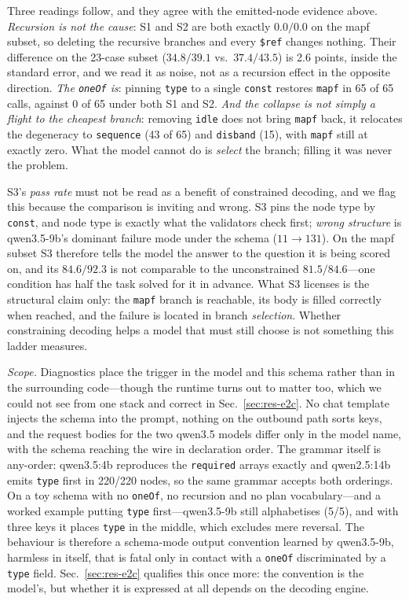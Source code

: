 \documentclass[10pt,twocolumn]{article}
\newcommand{\code}[1]{\texttt{\small #1}}
\begin{document}
Three readings follow, and they agree with the emitted-node evidence above.
\emph{Recursion is not the cause}: S1 and S2 are both exactly $0.0/0.0$ on the
mapf subset, so deleting the recursive branches and every \code{\$ref} changes
nothing. Their difference on the 23-case subset ($34.8/39.1$ vs.\ $37.4/43.5$)
is 2.6 points, inside the standard error, and we read it as noise, not as a recursion
effect in the opposite direction. \emph{The \code{oneOf} is}: pinning
\code{type} to a single \code{const} restores \code{mapf} in 65 of 65 calls,
against 0 of 65 under both S1 and S2. \emph{And the collapse is not simply a
flight to the cheapest branch}: removing \code{idle} does not bring \code{mapf}
back, it relocates the degeneracy to \code{sequence} (43 of 65) and
\code{disband} (15), with \code{mapf} still at exactly zero. What the model
cannot do is \emph{select} the branch; filling it was never the problem.

S3's \emph{pass rate} must not be read as a benefit of constrained decoding,
and we flag this because the comparison is inviting and wrong. S3 pins the node
type by \code{const}, and node type is exactly what the validators check first;
\emph{wrong structure} is qwen3.5-9b's dominant failure mode under the schema
($11\to131$). On the mapf subset S3 therefore tells the model the answer to the
question it is being scored on, and its $84.6/92.3$ is not comparable to the
unconstrained $81.5/84.6$---one condition has half the task solved for it in
advance. What S3 licenses is the structural claim only: the \code{mapf} branch
is reachable, its body is filled correctly when reached, and the failure is
located in branch \emph{selection}. Whether constraining decoding helps a model
that must still choose is not something this ladder measures.

\emph{Scope.} Diagnostics place the trigger in the model and this schema
rather than in the surrounding code---though the runtime turns out to matter
too, which we could not see from one stack and correct in
Sec.~\ref{sec:res-e2c}. No chat template injects the schema into the prompt, nothing on
the outbound path sorts keys, and the request bodies for the two qwen3.5
models differ only in the model name, with the schema reaching the wire in
declaration order. The grammar itself is any-order: qwen3.5:4b reproduces the
\code{required} arrays exactly and qwen2.5:14b emits \code{type} first in
220/220 nodes, so the same grammar accepts both orderings. On a toy schema
with no \code{oneOf}, no recursion and no plan vocabulary---and a worked
example putting \code{type} first---qwen3.5-9b still alphabetises (5/5), and
with three keys it places \code{type} in the middle, which excludes mere
reversal. The behaviour is therefore a schema-mode output convention learned
by qwen3.5-9b, harmless in itself, that is fatal only in contact with a
\code{oneOf} discriminated by a \code{type} field. Sec.~\ref{sec:res-e2c}
qualifies this once more: the convention is the model's, but whether it is
expressed at all depends on the decoding engine.
\end{document}
